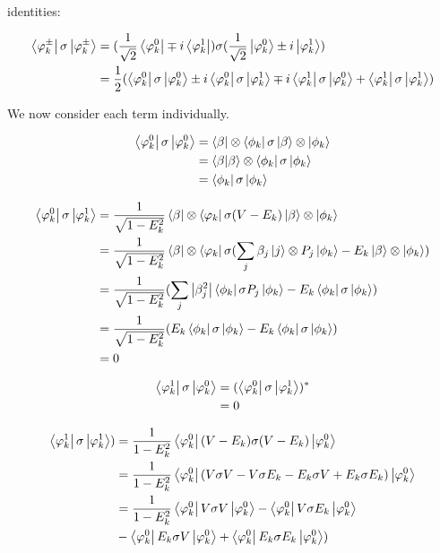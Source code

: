 identities:

\newpage

\begin{align}
\bra{\varphi_k^{\pm}} \sigma \ket{\varphi_k^{\pm}} &= (\frac{1}{\sqrt{2}}\bra{\varphi_k^0} \mp i \bra{\varphi_k^1}) \sigma (\frac{1}{\sqrt{2}} \ket{\varphi_k^0} \pm i \ket{\varphi_k^1})\\
&= \frac{1}{2}(\bra{\varphi_k^0} \sigma \ket{\varphi_k^0} \pm i \bra{\varphi_k^0} \sigma \ket{\varphi_k^1} \mp i \bra{\varphi_k^1} \sigma \ket{\varphi_k^0} + \bra{\varphi_k^1} \sigma \ket{\varphi_k^1})\\
\end{align}

We now consider each term individually.

\begin{align*}
  \bra{\varphi_k^0} \sigma \ket{\varphi_k^0} &= \bra{\beta} \otimes \bra{\phi_k} \sigma \ket{\beta} \otimes \ket{\phi_k}\\
  &= \braket{\beta}{\beta} \otimes \bra{\phi_k} \sigma \ket{\phi_k}\\
  &= \bra{\phi_k} \sigma \ket{\phi_k}
\end{align*}


\begin{align*}
  \bra{\varphi_k^0} \sigma \ket{\varphi_k^1} &=
  \frac{1}{\sqrt{1-E_k^2}} \bra{\beta} \otimes \bra{\varphi_k} \sigma (V - E_k) \ket{\beta} \otimes \ket{\phi_k}\\
  &=\frac{1}{\sqrt{1-E_k^2}} \bra{\beta} \otimes \bra{\varphi_k} \sigma ( \sum_j\beta_j \ket{j} \otimes P_j \ket{\phi_k} - E_k \ket{\beta} \otimes \ket{\phi_k})\\
  &= \frac{1}{\sqrt{1-E_k^2}}(\sum_j \abs{\beta_j^2} \bra{\phi_k} \sigma P_j\ket{\phi_k} - E_k \bra{\phi_k} \sigma \ket{\phi_k})\\
  &= \frac{1}{\sqrt{1-E_k^2}}( E_k \bra{\phi_k} \sigma \ket{\phi_k} - E_k \bra{\phi_k} \sigma \ket{\phi_k})\\
  &= 0
\end{align*}

\begin{align*}
  \bra{\varphi_k^1} \sigma \ket{\varphi_k^0} &= (\bra{\varphi_k^0} \sigma \ket{\varphi_k^1})^*\\
  &= 0
\end{align*}

\begin{align}
  \bra{\varphi_k^1} \sigma \ket{\varphi_k^1}) &=
  \frac{1}{1-E_k^2} \bra{\varphi_k^0} (V-E_k) \sigma (V-E_k) \ket{\varphi_k^0}\\
  &= \frac{1}{1-E_k^2} \bra{\varphi_k^0} (V \sigma V - V\sigma E_k - E_k \sigma V + E_k \sigma E_k )\ket{\varphi_k^0}\\
  &= \frac{1}{1-E_k^2} \bra{\varphi_k^0} V \sigma V \ket{\varphi_k^0} - \bra{\varphi_k^0} V\sigma E_k \ket{\varphi_k^0}\\
    &- \bra{\varphi_k^0} E_k \sigma V \ket{\varphi_k^0} + \bra{\varphi_k^0} E_k \sigma E_k \ket{\varphi_k^0})
\end{align}


